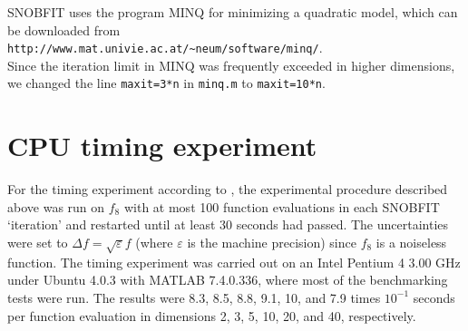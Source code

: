\documentclass{sig-alternate}
\begin{document}
SNOBFIT uses the program MINQ for minimizing a quadratic model, which can be
downloaded from\\
 \verb|http://www.mat.univie.ac.at/~neum/software/minq/|.\\ 
Since the iteration limit in MINQ was frequently exceeded in higher dimensions, we
changed the line {\tt maxit=3*n} in {\tt minq.m} to {\tt maxit=10*n}.

\section{CPU timing experiment}

For the timing experiment according to \cite{hansen2009exp},
the experimental procedure described above was run on $f_8$
with at most 100 function evaluations in each SNOBFIT `iteration' and restarted 
until at least 30 seconds had passed. The uncertainties were set to $\Delta f
= \sqrt{\varepsilon}f$ (where $\varepsilon$ is the machine precision) since
$f_8$ is a noiseless function.
The timing experiment was carried out on an Intel Pentium 4 3.00 GHz under Ubuntu 4.0.3 
with MATLAB 7.4.0.336, where most of the benchmarking tests were run. 
The results were
8.3, 8.5, 8.8, 9.1, 10, and 7.9 times $10^{-1}$ seconds per function evaluation
in dimensions 2, 3, 5, 10, 20, and 40, respectively.


\end{document}
